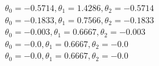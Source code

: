 \documentclass[11pt]{article} %
\begin{document}
\begin{figure}[h]
\qquad
{}
\end{figure}
\(\theta_0= -0.5714, \theta_1= 1.4286 , \theta_2 =-0.5714\)\\
\(\theta_0 =-0.1833, \theta_1= 0.7566 , \theta_2 =-0.1833\)\\
\(\theta_0 =-0.003, \theta_1= 0.6667 , \theta_2 =-0.003\)\\
\(\theta_0 =-0.0, \theta_1= 0.6667 , \theta_2= -0.0\)\\
\(\theta_0 =-0.0, \theta_1 =0.6667 , \theta_2 =-0.0\)\\
\end{document}
